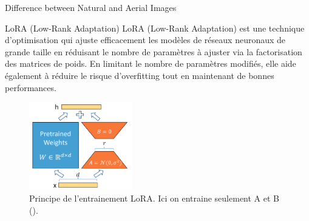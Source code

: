 \begin{subsectionframemod}{Difference between Natural and Aerial Images}
    \begin{alertblock}{LoRA (Low-Rank Adaptation)}
        LoRA (Low-Rank Adaptation) est une technique d'optimisation qui ajuste efficacement les modèles de réseaux neuronaux de grande taille en réduisant le nombre de paramètres à ajuster via la factorisation des matrices de poids.
        En limitant le nombre de paramètres modifiés, elle aide également à réduire le risque d'overfitting tout en maintenant de bonnes performances.
    \end{alertblock}
    \vspace{5mm}

    \begin{figure}
        \includegraphics[width=0.4\textwidth]{Figures/lora.png}
        \caption{Principe de l'entrainement LoRA. Ici on entraine seulement A et B (\cite{edward2021lora}).}
    \end{figure}


\end{subsectionframemod}